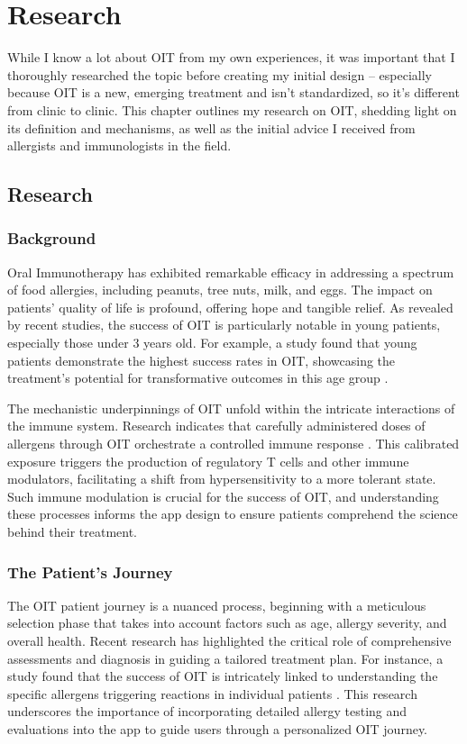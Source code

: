 \chapter{Research}

While I know a lot about OIT from my own experiences, it was important that I thoroughly researched the topic before creating my initial design – especially because OIT is a new, emerging treatment and isn't standardized, so it's different from clinic to clinic. This chapter outlines my research on OIT, shedding light on its definition and mechanisms, as well as the initial advice I received from allergists and immunologists in the field.

\section{Research}

\subsection{Background}
Oral Immunotherapy has exhibited remarkable efficacy in addressing a spectrum of food allergies, including peanuts, tree nuts, milk, and eggs. The impact on patients' quality of life is profound, offering hope and tangible relief. As revealed by recent studies, the success of OIT is particularly notable in young patients, especially those under 3 years old. For example, a study found that young patients demonstrate the highest success rates in OIT, showcasing the treatment's potential for transformative outcomes in this age group \cite{Blumchen}.

The mechanistic underpinnings of OIT unfold within the intricate interactions of the immune system. Research indicates that carefully administered doses of allergens through OIT orchestrate a controlled immune response \cite{Nairn}. This calibrated exposure triggers the production of regulatory T cells and other immune modulators, facilitating a shift from hypersensitivity to a more tolerant state. Such immune modulation is crucial for the success of OIT, and understanding these processes informs the app design to ensure patients comprehend the science behind their treatment. 

\subsection{The Patient's Journey}

The OIT patient journey is a nuanced process, beginning with a meticulous selection phase that takes into account factors such as age, allergy severity, and overall health. Recent research has highlighted the critical role of comprehensive assessments and diagnosis in guiding a tailored treatment plan. For instance, a study found that the success of OIT is intricately linked to understanding the specific allergens triggering reactions in individual patients \cite{Dominguez}. This research underscores the importance of incorporating detailed allergy testing and evaluations into the app to guide users through a personalized OIT journey.

